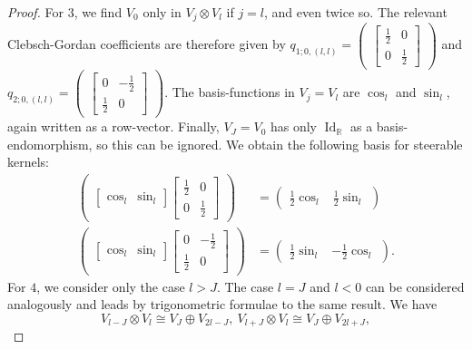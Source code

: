 \documentclass[12pt, a4paper]{article}
\theoremstyle{plain}
\theoremstyle{definition}
\theoremstyle{remark}
\newcommand{\R}{\mathds{R}}
\DeclareMathOperator{\Id}{Id}
\begin{document}
\begin{proof}
For $3$, we find $V_0$ only in $V_j \otimes V_l$ if $j = l$, and even twice so. The relevant Clebsch-Gordan coefficients are therefore given by $q_{1; 0,(l,l)} = \begin{pmatrix} \begin{bmatrix} \frac{1}{2} & 0 \\ 0 & \frac{1}{2} \end{bmatrix}\end{pmatrix}$ and $q_{2;0,(l,l)} = \begin{pmatrix} \begin{bmatrix} 0 & - \frac{1}{2} \\ \frac{1}{2} & 0 \end{bmatrix}\end{pmatrix}$. The basis-functions in $V_j = V_l$ are $\cos_l$ and $\sin_l$, again written as a row-vector. Finally, $V_J = V_0$ has only $\Id_\R$ as a basis-endomorphism, so this can be ignored. We obtain the following basis for steerable kernels:
\begin{align*}
\begin{pmatrix} \begin{bmatrix} \cos_l & \sin_l \end{bmatrix} \begin{bmatrix} \frac{1}{2} & 0 \\ 0 & \frac{1}{2} \end{bmatrix} \end{pmatrix} & = \begin{pmatrix}  \frac{1}{2} \cos_l & \frac{1}{2} \sin_l \end{pmatrix} \\
\begin{pmatrix} \begin{bmatrix} \cos_l & \sin_l \end{bmatrix} \begin{bmatrix} 0 & - \frac{1}{2} \\ \frac{1}{2} & 0 \end{bmatrix} \end{pmatrix} & = \begin{pmatrix}  \frac{1}{2} \sin_l & -\frac{1}{2} \cos_l \end{pmatrix}.
\end{align*}
For $4$, we consider only the case $l > J$. The case $l = J$ and $l < 0$ can be considered analogously and leads by trigonometric formulae to the same result. We have
\begin{equation*}
V_{l-J} \otimes V_l \cong V_J \oplus V_{2l-J}, \ V_{l+J} \otimes V_l \cong V_J \oplus V_{2l+J},

\end{equation*}
\end{proof}
\end{document}
